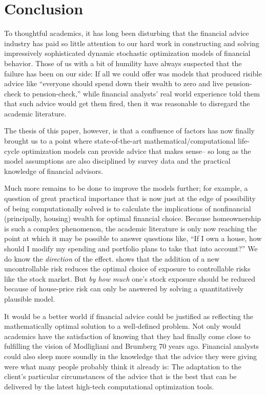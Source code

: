 \documentclass{article}
\begin{document}
\section{Conclusion}

To thoughtful academics, it has long been disturbing that the financial advice industry has paid so little attention to our hard work in constructing and solving impressively sophisticated dynamic stochastic optimization models of financial behavior.
Those of us with a bit of humility have always suspected that the failure has been on our side: If all we could offer was models that produced risible advice like ``everyone should spend down their wealth to zero and live pension-check to pension-check,'' while financial analysts' real world experience told them that such advice would get them fired, then it was reasonable to disregard the academic literature.

The thesis of this paper, however, is that a confluence of factors has now finally brought us to a point where state-of-the-art mathematical/computational life-cycle optimization models can provide advice that makes sense-- so long as the model assumptions are also disciplined by survey data and the practical knowledge of financial advisors.

Much more remains to be done to improve the models further; for example, a question of great practical importance that is now just at the edge of possibility of being computationally solved is to calculate the implications of nonfinancial (principally, housing) wealth for optimal financial choice.
Because homeownership is such a complex phenomenon, the academic literature is only now reaching the point at which it may be possible to answer questions like, ``If I own a house, how should I modify my spending and portfolio plans to take that into account?''
We do know the \textit{direction} of the effect.
\cite{kimballStandardRA} shows that the addition of a new uncontrollable risk reduces the optimal choice of exposure to controllable risks like the stock market.
But \textit{by how much} one's stock exposure should be reduced because of house-price risk can only be answered by solving a quantitatively plausible model.

It would be a better world if financial advice could be justified as reflecting the mathematically optimal solution to a well-defined problem.
Not only would academics have the satisfaction of knowing that they had finally come close to fulfilling the vision of Modligliani and Brumberg 70 years ago.
Financial analysts could also sleep more soundly in the knowledge that the advice they were giving were what many people probably think it already is: The adaptation to the client's particular circumstances of the advice that is the best that can be delivered by the latest high-tech computational optimization tools.
\end{document}
